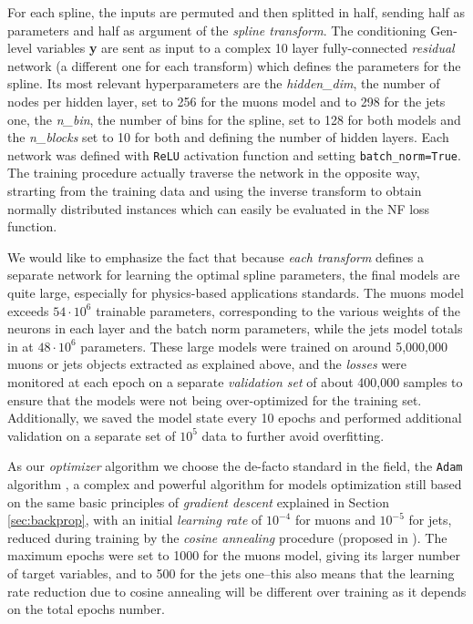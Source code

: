 For each spline, the inputs are permuted and then splitted in half, sending half as parameters and half as argument of the \emph{spline transform}. The conditioning Gen-level variables \textbf{y} are sent as input to a complex 10 layer fully-connected \emph{residual} network (a different one for each transform) which defines the parameters for the spline. Its most relevant hyperparameters are the \emph{hidden\_dim}, the number of nodes per hidden layer, set to 256 for the muons model and to 298 for the jets one, the \emph{n\_bin}, the number of bins for the spline, set to 128 for both models and the \emph{n\_blocks} set to 10 for both and defining the number of hidden layers.
Each network was defined with \texttt{ReLU} activation function and setting \texttt{batch\_norm=True}. The training procedure actually traverse the network in the opposite way, strarting from the training data and using the inverse transform to obtain normally distributed instances which can easily be evaluated in the NF loss function.

We would like to emphasize the fact that because \emph{each transform} defines a separate network for learning the optimal spline parameters, the final models are quite large, especially for physics-based applications standards. The muons model exceeds $54\cdot 10^6$ trainable parameters, corresponding to the various weights of the neurons in each layer and the batch norm parameters, while the jets model totals in at $48\cdot 10^6$ parameters. These large models were trained on around 5,000,000 muons or jets objects extracted as explained above, and the \emph{losses} were monitored at each epoch on a separate \emph{validation set} of about 400,000 samples to ensure that the models were not being over-optimized for the training set. Additionally, we saved the model state every 10 epochs and performed additional validation on a separate set of $10^5$ data to further avoid overfitting.

As our \emph{optimizer} algorithm we choose the de-facto standard in the field, the \texttt{Adam} algorithm \cite{https://doi.org/10.48550/arxiv.1412.6980}, a complex and powerful algorithm for models optimization still based on the same basic principles of \emph{gradient descent} explained in Section \ref{sec:backprop}, with an initial \emph{learning rate} of $10^{-4}$ for muons and $10^{-5}$ for jets, reduced during training by the \emph{cosine annealing} procedure (proposed in \cite{https://doi.org/10.48550/arxiv.1608.03983}). The maximum epochs were set to 1000 for the muons model, giving its larger number of target variables, and to 500 for the jets one--this also means that the learning rate reduction due to cosine annealing will be different over training as it depends on the total epochs number.


